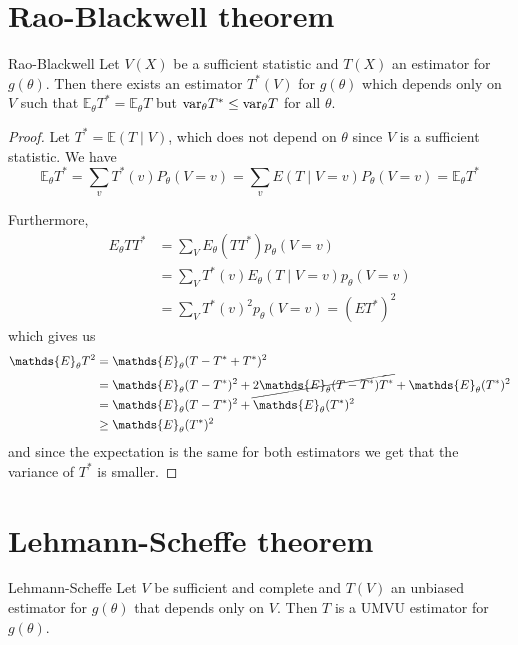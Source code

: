 \documentclass[12pt]{extarticle}
\renewcommand{\var}{{\operatorfont var}}
\newcommand{\E}{\mathds{E}}
\begin{document}
\section{Rao-Blackwell theorem}

\begin{theorem}{Rao-Blackwell}{}
	Let $V(X)$ be a sufficient statistic and $T(X)$ an estimator for $g(\theta)$.
	Then there exists an estimator $T^*(V)$ for $g(\theta)$ which depends only on $V$
	such that $\E_\theta T^* = \E_\theta T$ but $\var_\theta T^* \leq \var_\theta T$ for all $\theta$.
\end{theorem}

\begin{proof}
	Let $T^* = \E(T \mid V)$, which does not depend on $\theta$ since $V$ is a sufficient statistic.
	We have
	\begin{equation}
		\E_\theta T^* = \sum_v T^*(v) P_\theta(V = v) = \sum_v E(T\mid V = v) P_\theta(V = v) = \E_\theta T^*
	\end{equation}

	Furthermore,
	\begin{align}
		E_\theta T T^* & = \sum_V E_\theta(T T^*) p_\theta(V = v)                \\
		               & = \sum_V T^*(v) E_\theta(T \mid V = v) p_\theta (V = v) \\
		               & = \sum_V T^*(v)^2 p_\theta(V = v) = (ET^*)^2
	\end{align}
	which gives us
	\begin{align}
		\E_\theta T^2 & = \E_\theta (T - T^* + T^*)^2                                               \\
		              & = \E_\theta(T - T^*)^2 + \cancel{2 \E_\theta(T-T^*) T^*} + \E_\theta(T^*)^2 \\
		              & = \E_\theta(T - T^*)^2 + \E_\theta(T^*)^2                                   \\
		              & \geq \E_\theta(T^*)^2
	\end{align}
	and since the expectation is the same for both estimators we get that the variance of $T^*$ is smaller.
\end{proof}

\section{Lehmann-Scheffe theorem}
\begin{theorem}{Lehmann-Scheffe}{}
	Let $V$ be sufficient and complete and $T(V)$ an unbiased estimator for $g(\theta)$
	that depends only on $V$.
	Then $T$ is a UMVU estimator for $g(\theta)$.
\end{theorem}
\end{document}
